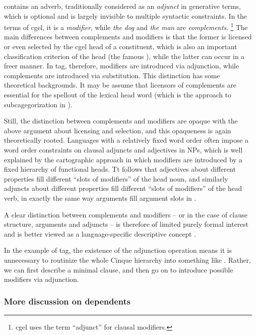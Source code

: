 \documentclass[../main.tex]{subfiles}
\begin{document}
 contains an adverb, 
traditionally considered as an \emph{adjunct} in generative terms, 
which is optional and is largely invisible to multiple syntactic constraints. 
In the terms of \ac{cgel}, it is a \emph{modifier}, 
while \emph{the dog} and \emph{the man} are \emph{complements}.%
\footnote{\ac{cgel} uses the term ``adjunct'' for clausal modifiers.}
The main differences between complements and modifiers 
is that the former is licensed or even selected by the \ac{cgel} head of a constituent, 
which is also an important classification criterion of the head (the famous ),
while the latter can occur in a freer manner. 
In \ac{tag}, therefore, modifiers are introduced via adjunction, 
while complements are introduced via substitution.
This distinction has some theoretical backgrounds.
It may be assume that licensors of complements are essential for the spellout of the lexical head word
(which is the approach to subcagegorization in \citet{siddiqi2009syntax}).

Still, the distinction between complements and modifiers are opaque with 
the above argument about licensing and selection, and this opaqueness is again theoretically rooted. 
Languages with a relatively fixed word order often impose 
a word order constraints on clausal adjuncts and adjectives in NPs, 
which is well explained by the cartographic approach in which modifiers 
are introduced by a fixed hierarchy of functional heads. 
Tt follows that adjectives about different properties fill different ``slots of modifiers'' of the head noun, 
and similarly adjuncts about different properties fill different ``slots of modifiers'' of the head verb, 
in exactly the same way arguments fill argument slots in . 

A clear distinction between complements and modifiers -- 
or in the case of clause structure, arguments and adjuncts -- 
is therefore of limited purely formal interest and 
is better viewed as a language-specific descriptive concept \citep{haspelmath2014arguments}. 

In the example of \ac{tag}, the existence of the adjunction operation means it is unnecessary
to routinize the whole Cinque hierarchy into something like .
Rather, we can first describe a minimal clause, 
and then go on to introduce possible modifiers via adjunction. 

\subsubsection{More discussion on dependents}\label{sec:dependents-types-enumerate}
\end{document}
